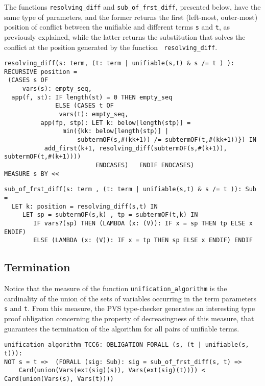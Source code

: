 \documentclass[submission,copyright,creativecommons]{eptcs}
\begin{document}
  The functions {\tt resolving\_diff} and {\tt sub\_of\_frst\_diff},
  presented below, have the same type of parameters, and the former
  returns the first (left-most, outer-most) position of conflict
  between the unifiable and different terms {\tt s} and {\tt t}, as
  previously explained, while the latter returns the substitution that
  solves the conflict at the position generated by the function {\tt
    resolving\_diff}.

  {\small
\begin{verbatim}
resolving_diff(s: term, (t: term | unifiable(s,t) & s /= t ) ): RECURSIVE position =
 (CASES s OF
     vars(s): empty_seq,  
  app(f, st): IF length(st) = 0 THEN empty_seq
              ELSE (CASES t OF  
               vars(t): empty_seq,
          app(fp, stp): LET k: below[length(stp)] =
                min({kk: below[length(stp)] |
                    subtermOF(s,#(kk+1)) /= subtermOF(t,#(kk+1))}) IN
           add_first(k+1, resolving_diff(subtermOF(s,#(k+1)), subtermOF(t,#(k+1))))
                         ENDCASES)   ENDIF ENDCASES)
MEASURE s BY <<
\end{verbatim}
  }

  {\small
\begin{verbatim}
sub_of_frst_diff(s: term , (t: term | unifiable(s,t) & s /= t )): Sub =
  LET k: position = resolving_diff(s,t) IN
     LET sp = subtermOF(s,k) , tp = subtermOF(t,k) IN
        IF vars?(sp) THEN (LAMBDA (x: (V)): IF x = sp THEN tp ELSE x ENDIF)
        ELSE (LAMBDA (x: (V)): IF x = tp THEN sp ELSE x ENDIF) ENDIF 
\end{verbatim}
  }

  \subsection{Termination}\label{ssec:termination}

  Notice that the measure of the function {\tt unification\_algorithm}
  is the cardinality of the union of the sets of variables occurring
  in the term parameters {\tt s} and {\tt t}. From this measure, the
  PVS type-checker generates an interesting type proof obligation
  concerning the property of decreasingness of this measure, that
  guarantees the termination of the algorithm for all pairs of
  unifiable terms.

  {\small
\begin{verbatim}
unification_algorithm_TCC6: OBLIGATION FORALL (s, (t | unifiable(s, t))): 
NOT s = t =>  (FORALL (sig: Sub): sig = sub_of_frst_diff(s, t) =>
    Card(union(Vars(ext(sig)(s)), Vars(ext(sig)(t)))) < Card(union(Vars(s), Vars(t))))
\end{verbatim}
  }
\end{document}
